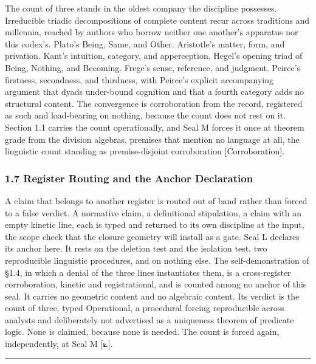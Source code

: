 \documentclass[10pt,twocolumn]{article}
\begin{document}
The count of three stands in the oldest company the discipline
possesses. Irreducible triadic decompositions of complete content recur
across traditions and millennia, reached by authors who borrow neither
one another's apparatus nor this codex's. Plato's Being, Same, and
Other. Aristotle's matter, form, and privation. Kant's intuition,
category, and apperception. Hegel's opening triad of Being, Nothing, and
Becoming. Frege's sense, reference, and judgment. Peirce's firstness,
secondness, and thirdness, with Peirce's explicit accompanying argument
that dyads under-bound cognition and that a fourth category adds no
structural content. The convergence is corroboration from the record,
registered as such and load-bearing on nothing, because the count does
not rest on it. Section 1.1 carries the count operationally, and Seal M
forces it once at theorem grade from the division algebras, premises
that mention no language at all, the linguistic count standing as
premise-disjoint corroboration {[}Corroboration{]}.

\hypertarget{register-routing-and-the-anchor-declaration}{%
\subsubsection{1.7 Register Routing and the Anchor
Declaration}\label{register-routing-and-the-anchor-declaration}}

A claim that belongs to another register is routed out of band rather
than forced to a false verdict. A normative claim, a definitional
stipulation, a claim with an empty kinetic line, each is typed and
returned to its own discipline at the input, the scope check that the
closure geometry will install as a gate. Seal L declares its anchor
here. It rests on the deletion test and the isolation test, two
reproducible linguistic procedures, and on nothing else. The
self-demonstration of §1.4, in which a denial of the three lines
instantiates them, is a cross-register corroboration, kinetic and
registrational, and is counted among no anchor of this seal. It carries
no geometric content and no algebraic content. Its verdict is the count
of three, typed Operational, a procedural forcing reproducible across
analysts and deliberately not advertised as a uniqueness theorem of
predicate logic. None is claimed, because none is needed. The count is
forced again, independently, at Seal M {[}⟀{]}.

\begin{center}\rule{0.5\linewidth}{0.5pt}\end{center}
\end{document}
